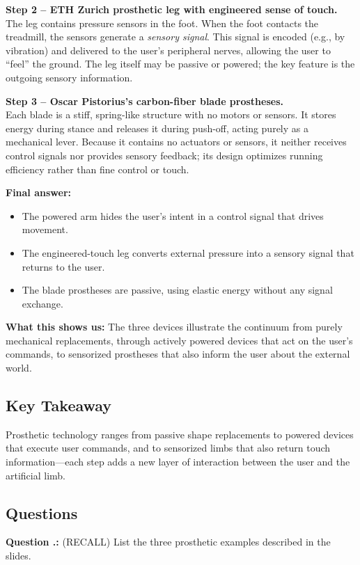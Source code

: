 \documentclass[12pt, a4paper]{article}
\newcounter{question}[section]
\renewcommand{\thequestion}{\thesection.\arabic{question}}
\newenvironment{question}
  {\refstepcounter{question}\par\noindent\textbf{Question \thequestion:}}
  {\par}
\begin{document}
\textbf{Step 2 -- ETH Zurich prosthetic leg with engineered sense of touch.}\\
The leg contains pressure sensors in the foot.  When the foot contacts the treadmill, the sensors generate a \emph{sensory signal}.  This signal is encoded (e.g., by vibration) and delivered to the user's peripheral nerves, allowing the user to ``feel'' the ground.  The leg itself may be passive or powered; the key feature is the outgoing sensory information.

\textbf{Step 3 -- Oscar Pistorius's carbon-fiber blade prostheses.}\\
Each blade is a stiff, spring-like structure with no motors or sensors.  It stores energy during stance and releases it during push-off, acting purely as a mechanical lever.  Because it contains no actuators or sensors, it neither receives control signals nor provides sensory feedback; its design optimizes running efficiency rather than fine control or touch.

\textbf{Final answer:}  
\begin{itemize}
\item The powered arm hides the user's intent in a control signal that drives movement.  
\item The engineered-touch leg converts external pressure into a sensory signal that returns to the user.  
\item The blade prostheses are passive, using elastic energy without any signal exchange.
\end{itemize}
\textbf{What this shows us:}  The three devices illustrate the continuum from purely mechanical replacements, through actively powered devices that act on the user's commands, to sensorized prostheses that also inform the user about the external world.

\subsection{Key Takeaway}
Prosthetic technology ranges from passive shape replacements to powered devices that execute user commands, and to sensorized limbs that also return touch information---each step adds a new layer of interaction between the user and the artificial limb.

\newpage
\subsection{Questions}

\begin{question}
(RECALL) List the three prosthetic examples described in the slides.
\end{question}
\end{document}
